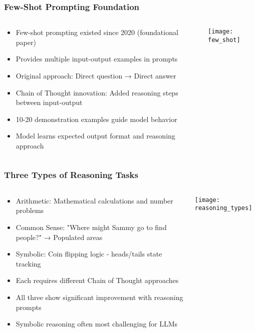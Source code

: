 \begin{frame}[fragile]\frametitle{Few-Shot Prompting Foundation}
\begin{columns}
    \begin{column}[T]{0.6\linewidth}
      \begin{itemize}
        \item Few-shot prompting existed since 2020 (foundational paper)
        \item Provides multiple input-output examples in prompts
        \item Original approach: Direct question → Direct answer
        \item Chain of Thought innovation: Added reasoning steps between input-output
        \item 10-20 demonstration examples guide model behavior
        \item Model learns expected output format and reasoning approach
      \end{itemize}
    \end{column}
    \begin{column}[T]{0.4\linewidth}
        \begin{center}
        \texttt{[image: few\_shot]}
        \end{center}	
    \end{column}
  \end{columns}
\end{frame}

\begin{frame}[fragile]\frametitle{Three Types of Reasoning Tasks}
\begin{columns}
    \begin{column}[T]{0.6\linewidth}
      \begin{itemize}
        \item Arithmetic: Mathematical calculations and number problems
        \item Common Sense: "Where might Sammy go to find people?" → Populated areas
        \item Symbolic: Coin flipping logic - heads/tails state tracking
        \item Each requires different Chain of Thought approaches
        \item All three show significant improvement with reasoning prompts
        \item Symbolic reasoning often most challenging for LLMs
      \end{itemize}
    \end{column}
    \begin{column}[T]{0.4\linewidth}
        \begin{center}
        \texttt{[image: reasoning\_types]}
        \end{center}	
    \end{column}
  \end{columns}
\end{frame}

